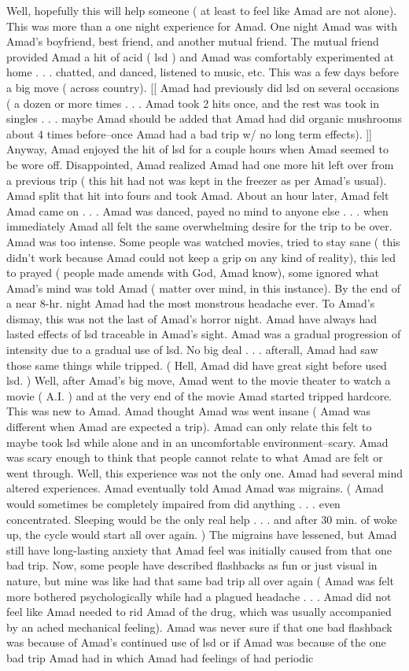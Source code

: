 \documentclass[12pt]{book}
\begin{document}
Well, hopefully this will help someone ( at least to feel like Amad are not alone). This was more than a one night experience for Amad. One night Amad was with Amad's boyfriend, best friend, and another mutual friend. The mutual friend provided Amad a hit of acid ( lsd ) and Amad was comfortably experimented at home . . .  chatted, and danced, listened to music, etc. This was a few days before a big move ( across country). [[ Amad had previously did lsd on several occasions ( a dozen or more times . . .  Amad took 2 hits once, and the rest was took in singles . . .  maybe Amad should be added that Amad had did organic mushrooms about 4 times before--once Amad had a bad trip w/ no long term effects). ]] Anyway, Amad enjoyed the hit of lsd for a couple hours when Amad seemed to be wore off. Disappointed, Amad realized Amad had one more hit left over from a previous trip ( this hit had not was kept in the freezer as per Amad's usual). Amad split that hit into fours and took Amad. About an hour later, Amad felt Amad came on . . .  Amad was danced, payed no mind to anyone else . . .  when immediately Amad all felt the same overwhelming desire for the trip to be over. Amad was too intense. Some people was watched movies, tried to stay sane ( this didn't work because Amad could not keep a grip on any kind of reality), this led to prayed ( people made amends with God, Amad know), some ignored what Amad's mind was told Amad ( matter over mind, in this instance). By the end of a near 8-hr. night Amad had the most monstrous headache ever. To Amad's dismay, this was not the last of Amad's horror night. Amad have always had lasted effects of lsd traceable in Amad's sight. Amad was a gradual progression of intensity due to a gradual use of lsd. No big deal . . .  afterall, Amad had saw those same things while tripped. ( Hell, Amad did have great sight before used lsd. ) Well, after Amad's big move, Amad went to the movie theater to watch a movie ( A.I. ) and at the very end of the movie Amad started tripped hardcore. This was new to Amad. Amad thought Amad was went insane ( Amad was different when Amad are expected a trip). Amad can only relate this felt to maybe took lsd while alone and in an uncomfortable environment--scary. Amad was scary enough to think that people cannot relate to what Amad are felt or went through. Well, this experience was not the only one. Amad had several mind altered experiences. Amad eventually told Amad Amad was migrains. ( Amad would sometimes be completely impaired from did anything . . .  even concentrated. Sleeping would be the only real help . . .  and after 30 min. of woke up, the cycle would start all over again. ) The migrains have lessened, but Amad still have long-lasting anxiety that Amad feel was initially caused from that one bad trip. Now, some people have described flashbacks as fun or just visual in nature, but mine was like had that same bad trip all over again ( Amad was felt more bothered psychologically while had a plagued headache . . .  Amad did not feel like Amad needed to rid Amad of the drug, which was usually accompanied by an ached mechanical feeling). Amad was never sure if that one bad flashback was because of Amad's continued use of lsd or if Amad was because of the one bad trip Amad had in which Amad had feelings of had periodic 
\end{document}
